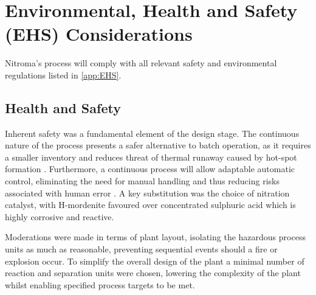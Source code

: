\section{Environmental, Health and Safety (EHS) Considerations}
\label{sec:ehs}


Nitroma's process will comply with all relevant safety and environmental regulations listed in \cref{app:EHS}. 

\subsection{Health and Safety}
Inherent safety was a fundamental element of the design stage. The continuous nature of the process presents a safer alternative to batch operation, as it requires a smaller inventory and reduces threat of thermal runaway caused by hot-spot formation \cite{mannan_lees_2012}. Furthermore, a continuous process will allow adaptable automatic control, eliminating the need for manual handling and thus reducing risks associated with human error \cite{mannan_lees_2012}. A key substitution was the choice of nitration catalyst, with H-mordenite favoured over concentrated sulphuric acid which is highly corrosive and reactive. 

Moderations were made in terms of plant layout, isolating the hazardous process units as much as reasonable, preventing sequential events should a fire or explosion occur. To simplify the overall design of the plant a minimal number of reaction and separation units were chosen, lowering the complexity of the plant whilst enabling specified process targets to be met. 


